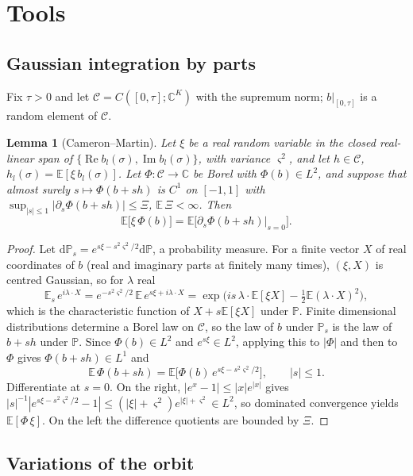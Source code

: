 \documentclass[11pt]{article}
\newcommand{\dd}{\mathrm{d}}
\newcommand{\E}{\mathbb{E}}
\newcommand{\PP}{\mathbb{P}}
\renewcommand{\Re}{\operatorname{Re}}
\renewcommand{\Im}{\operatorname{Im}}
\newtheorem{lemma}[theorem]{Lemma}
\theoremstyle{remark}
\begin{document}
\section{Tools}

\subsection{Gaussian integration by parts}

Fix $\tau>0$ and let $\mathcal{C} = C([0,\tau];\mathbb{C}^K)$ with the
supremum norm; $b|_{[0,\tau]}$ is a random element of $\mathcal{C}$.

\begin{lemma}[Cameron--Martin]\label{lem:ibp}
Let $\xi$ be a real random variable in the closed real-linear span of
$\{\Re b_l(\sigma),\Im b_l(\sigma)\}$, with variance $\varsigma^2$, and let
$h\in\mathcal{C}$, $h_l(\sigma) = \E[\xi\,b_l(\sigma)]$. Let
$\Phi:\mathcal{C}\to\mathbb{C}$ be Borel with $\Phi(b)\in L^2$, and suppose
that almost surely $s\mapsto\Phi(b+sh)$ is $C^1$ on $[-1,1]$ with
$\sup_{|s|\le1}|\partial_s\Phi(b+sh)|\le\Xi$, $\E\,\Xi<\infty$. Then
\[
  \E\bigl[\xi\,\Phi(b)\bigr] = \E\bigl[\partial_s\Phi(b+sh)\big|_{s=0}\bigr].
\]
\end{lemma}

\begin{proof}
Let $\dd\PP_s = e^{s\xi-s^2\varsigma^2/2}\dd\PP$, a probability measure.
For a finite vector $X$ of real coordinates of $b$ (real and imaginary parts
at finitely many times), $(\xi,X)$ is centred Gaussian, so for
$\lambda$ real
\[
  \E_s\,e^{i\lambda\cdot X}
  = e^{-s^2\varsigma^2/2}\,\E\,e^{s\xi+i\lambda\cdot X}
  = \exp\bigl(is\,\lambda\cdot\E[\xi X] - \tfrac12\E(\lambda\cdot X)^2\bigr),
\]
which is the characteristic function of $X+s\E[\xi X]$ under $\PP$. Finite
dimensional distributions determine a Borel law on $\mathcal{C}$, so the law
of $b$ under $\PP_s$ is the law of $b+sh$ under $\PP$. Since
$\Phi(b)\in L^2$ and $e^{s\xi}\in L^2$, applying this to $|\Phi|$ and then
to $\Phi$ gives $\Phi(b+sh)\in L^1$ and
\[
  \E\,\Phi(b+sh) = \E\bigl[\Phi(b)\,e^{s\xi-s^2\varsigma^2/2}\bigr],
  \qquad|s|\le1 .
\]
Differentiate at $s=0$. On the right, $|e^x-1|\le|x|e^{|x|}$ gives
$|s|^{-1}|e^{s\xi-s^2\varsigma^2/2}-1|\le(|\xi|+\varsigma^2)e^{|\xi|+\varsigma^2}\in L^2$,
so dominated convergence yields $\E[\Phi\,\xi]$. On the left the difference
quotients are bounded by $\Xi$.
\end{proof}

\subsection{Variations of the orbit}
\end{document}
